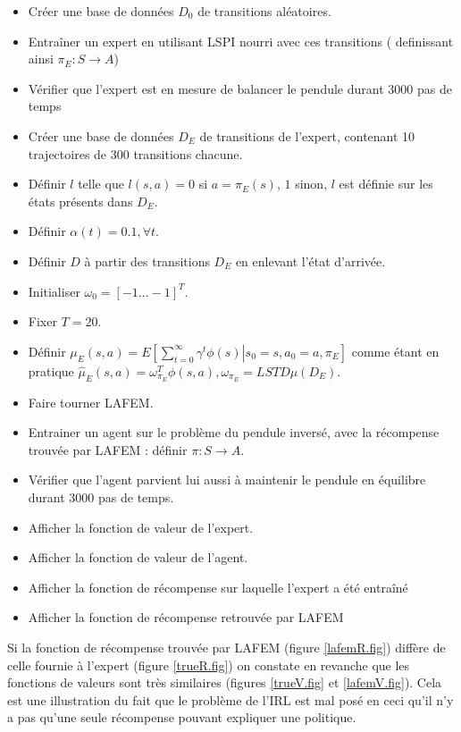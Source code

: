 \documentclass[publibook-draft]{CAp2012}
\begin{document}
\begin{itemize}
 \item Créer une base de données $D_0$ de transitions aléatoires.
 \item Entraîner un expert en utilisant LSPI nourri avec ces transitions ( definissant ainsi $\pi_E : S\rightarrow A$)
 \item Vérifier que l'expert est en mesure de balancer le pendule durant 3000 pas de temps
 \item Créer une base de données $D_E$ de transitions de l'expert, contenant 10 trajectoires de 300 transitions chacune.
 \item Définir $l$ telle que $l(s,a) = 0$ si $a=\pi_E(s)$, $1$ sinon, $l$ est définie sur les états présents dans $D_E$.
 \item Définir $\alpha(t) = 0.1,\forall t$.
 \item Définir $D$ à partir des transitions $D_E$ en enlevant l'état d'arrivée.
 \item Initialiser $\omega_0 = [-1...-1]^T$.
 \item Fixer $T=20$.
 \item Définir $\mu_E(s,a) = E\left.\left[\sum\limits_{t=0}^\infty \gamma^t \phi(s)\right|s_0 = s, a_0 = a, \pi_E\right]$ comme étant en pratique $\hat\mu_E(s,a) =  \omega^T_{\pi_E}\phi(s,a), \omega_{\pi_E} = LSTD\mu(D_E)$.
 \item Faire tourner LAFEM.
 \item Entrainer un agent sur le problème du pendule inversé, avec la récompense trouvée par LAFEM : définir $\pi : S\rightarrow A$.
 \item Vérifier que l'agent parvient lui aussi à maintenir le pendule en équilibre durant 3000 pas de temps.
 \item Afficher la fonction de valeur de l'expert.
 \item Afficher la fonction de valeur de l'agent.
 \item Afficher la fonction de récompense sur laquelle l'expert a été entraîné
 \item Afficher la fonction de récompense retrouvée par LAFEM
\end{itemize}

Si la fonction de récompense trouvée par LAFEM (figure \ref{lafemR.fig}) diffère de celle fournie à l'expert (figure \ref{trueR.fig}) on constate en revanche que les fonctions de valeurs sont très similaires (figures \ref{trueV.fig} et \ref{lafemV.fig}). Cela est une illustration du fait que le problème de l'IRL est mal posé en ceci qu'il n'y a pas qu'une seule récompense pouvant expliquer une politique.\\
\end{document}
